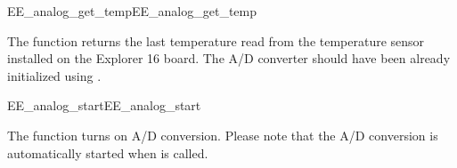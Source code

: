 \begin{function_nopb2}{EE\_analog\_get\_temp}{EE_analog_get_temp}
  
  \begin{fundescription}
    The function returns the last temperature read from the
    temperature sensor installed on the Explorer 16 board. The A/D
    converter should have been already initialized using
    .
  \end{fundescription}
  
  
  \begin{funreturn}
  \end{funreturn}
  
\end{function_nopb2}

\begin{function_nopb2}{EE\_analog\_start}{EE_analog_start}
  
  \begin{fundescription}
    The function turns on A/D conversion. Please note that the A/D
    conversion is automatically started when 
    is called.
  \end{fundescription}
  
  
  
\end{function_nopb2}

